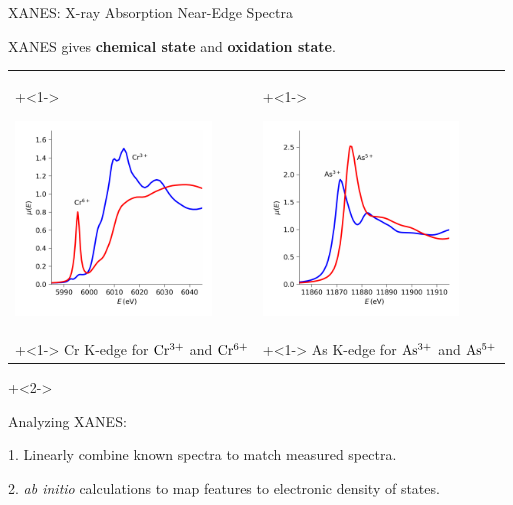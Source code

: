 \begin{slide}{XANES:  X-ray Absorption Near-Edge Spectra}

  XANES gives {\bf{chemical state}} and {\bf{oxidation state}}.


  \vmm
  \begin{tabular}{ll}
    \onslide+<1->
    \begin{minipage}{55mm}
      \includegraphics[width=52mm]{figs/xanes/cr}
    \end{minipage}
    &
    \onslide+<1->
    \begin{minipage}{55mm}
      \includegraphics[width=52mm]{figs/xanes/as}
    \end{minipage} \\
    \onslide+<1->
    \hspace{3mm} Cr K-edge for $\rm Cr^{3+}$ and $\rm Cr^{6+}$
    &
    \onslide+<1->
    \hspace{3mm}   As K-edge for $\rm As^{3+}$ and $\rm As^{5+}$
  \end{tabular}

  \onslide+<2->{
    \begin{cenpage}{110mm}
      Analyzing XANES: \vmm

      \hspace{3mm} 1.  Linearly combine known spectra to match measured spectra.

      \vmm

      \hspace{3mm} 2. {\emph{ab initio}} calculations to map features
      to electronic density of states.
    \end{cenpage}
    }
\vfill
\end{slide}
